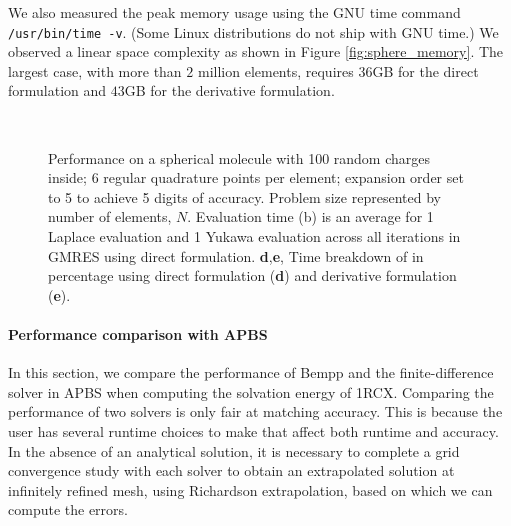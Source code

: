 We also measured the peak memory usage using the GNU time command \texttt{/usr/bin/time -v}. (Some Linux distributions do not ship with GNU time.)
We observed a linear space complexity as shown in Figure \ref{fig:sphere_memory}.
The largest case, with more than $2$ million elements, requires $36$GB for the direct formulation and $43$GB for the derivative formulation.

\begin{figure*}[t]
\centering
    \\
    \caption{Performance on a spherical molecule with 100 random charges inside;
    6 regular quadrature points per element; \fmm expansion order set to 5 to achieve 5 digits of accuracy. Problem size represented by number of elements, $N$. Evaluation time (b) is an average for 1 Laplace \fmm evaluation and 1 Yukawa \fmm evaluation across all iterations in GMRES using direct formulation.
    \textbf{d},\textbf{e}, Time breakdown of \gmres in percentage using direct formulation (\textbf{d}) and derivative formulation (\textbf{e}).}
\end{figure*}

\paragraph{Performance comparison with APBS} \label{result_comparison_apbs}
In this section, we compare the performance of Bempp and the finite-difference solver in APBS when computing the solvation energy of 1RCX.
Comparing the performance of two solvers is only fair at matching accuracy.
This is because the user has several runtime choices to make that affect both runtime and accuracy.
In the absence of an analytical solution, it is necessary to complete a grid convergence study with each solver to obtain an extrapolated solution at infinitely refined mesh, using Richardson extrapolation, based on which we can compute the errors.


